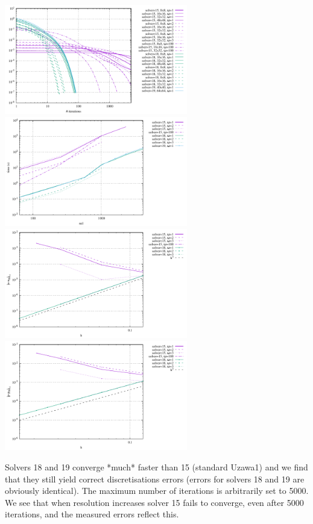 \begin{center}
\includegraphics[width=8cm]{python_codes/fieldstone_147/RESULTS/L2/uzawa1/solver_convergence.pdf}
\includegraphics[width=8cm]{python_codes/fieldstone_147/RESULTS/L2/uzawa1/time.pdf}\\
\includegraphics[width=8cm]{python_codes/fieldstone_147/RESULTS/L2/uzawa1/errorsV.pdf}
\includegraphics[width=8cm]{python_codes/fieldstone_147/RESULTS/L2/uzawa1/errorsP.pdf}
\end{center}

Solvers 18 and 19 converge *much* faster than 15 (standard Uzawa1) and we find that 
they still yield correct discretisations errors (errors for solvers 18 and 19
are obviously identical).
The maximum number of iterations is arbitrarily set to 5000. We see that when resolution increases 
solver 15 fails to converge, even after 5000 iterations, and the measured errors reflect this.

